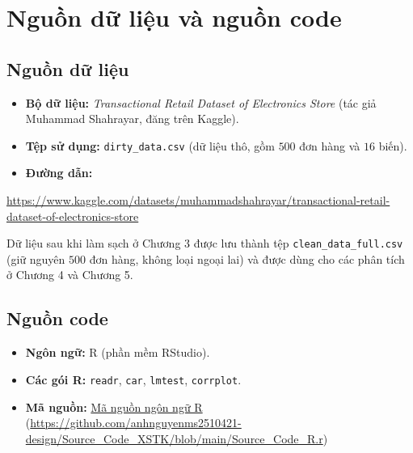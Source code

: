 \section{Nguồn dữ liệu và nguồn code}

\subsection{Nguồn dữ liệu}
\begin{itemize}
    \item \textbf{Bộ dữ liệu:} \textit{Transactional Retail Dataset of Electronics Store} (tác giả Muhammad Shahrayar, đăng trên Kaggle).
    \item \textbf{Tệp sử dụng:} \texttt{dirty\_data.csv} (dữ liệu thô, gồm $500$ đơn hàng và $16$ biến).
    \item \textbf{Đường dẫn:}
\end{itemize}
\begin{center}
\url{https://www.kaggle.com/datasets/muhammadshahrayar/transactional-retail-dataset-of-electronics-store}
\end{center}
Dữ liệu sau khi làm sạch ở Chương 3 được lưu thành tệp \texttt{clean\_data\_full.csv} (giữ nguyên $500$ đơn hàng, không loại ngoại lai) và được dùng cho các phân tích ở Chương 4 và Chương 5.

\subsection{Nguồn code}
\begin{itemize}
    \item \textbf{Ngôn ngữ:} R (phần mềm RStudio).
    \item \textbf{Các gói R:} \texttt{readr}, \texttt{car}, \texttt{lmtest}, \texttt{corrplot}.
    \item \textbf{Mã nguồn:} \href{https://github.com/anhnguyenms2510421-design/Source_Code_XSTK/blob/main/Source_Code_R.r}{Mã nguồn ngôn ngữ R}  \\
    (\url{https://github.com/anhnguyenms2510421-design/Source_Code_XSTK/blob/main/Source_Code_R.r})
\end{itemize}
